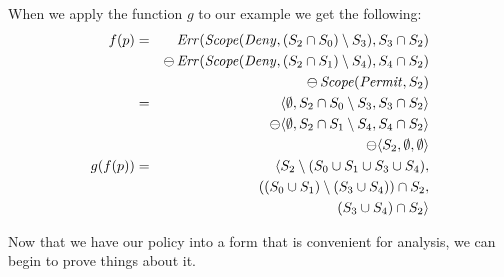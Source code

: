 When we apply the function $g$ to our example we get the following:
\begin{eqnarray*}
  f(p) & = & \text{\textit{Err}} (\text{\textit{Scope}} (\text{\textit{Deny}}, (S_2 \cap S_0) \setminus S_3), S_3 \cap S_2) \\
  & & \ominus \, \text{\textit{Err}} (\text{\textit{Scope}} (\text{\textit{Deny}}, (S_2 \cap S_1) \setminus S_4), S_4 \cap S_2) \\
  & & \ominus \, \text{\textit{Scope}} (\text{\textit{Permit}}, S_2)
  \\
  & = & \langle \emptyset, S_2 \cap S_0 \setminus S_3, S_3 \cap S_2 \rangle \\
  & & \ominus \langle \emptyset, S_2 \cap S_1 \setminus S_4, S_4 \cap S_2 \rangle \\
  & & \ominus \langle S_2, \emptyset, \emptyset \rangle
  \\
  g(f(p))  & = & \langle S_2 \setminus (S_0 \cup S_1 \cup S_3 \cup S_4), \\
  & & ((S_0 \cup S_1) \setminus (S_3 \cup S_4)) \cap S_2, \\
  & &  (S_3 \cup S_4) \cap S_2 \rangle
\end{eqnarray*}

Now that we have our policy into a form that is convenient for
analysis, we can begin to prove things about it.


